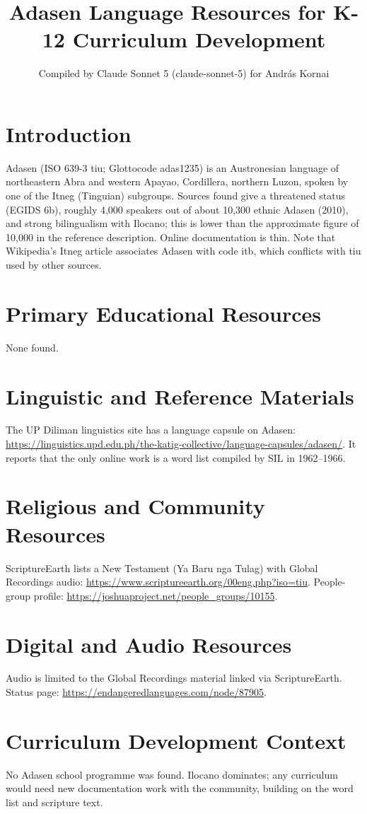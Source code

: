\documentclass[12pt]{article}
\title{Adasen Language Resources for K-12 Curriculum Development}
\author{Compiled by Claude Sonnet 5 (claude-sonnet-5) for Andr\'as Kornai}
\date{}
\begin{document}
\maketitle
\section{Introduction}
Adasen (ISO 639-3 tiu; Glottocode adas1235) is an Austronesian language of northeastern Abra and western Apayao, Cordillera, northern Luzon, spoken by one of the Itneg (Tinguian) subgroups. Sources found give a threatened status (EGIDS 6b), roughly 4,000 speakers out of about 10,300 ethnic Adasen (2010), and strong bilingualism with Ilocano; this is lower than the approximate figure of 10,000 in the reference description. Online documentation is thin. Note that Wikipedia's Itneg article associates Adasen with code itb, which conflicts with tiu used by other sources.
\section{Primary Educational Resources}
None found.
\section{Linguistic and Reference Materials}
The UP Diliman linguistics site has a language capsule on Adasen: \url{https://linguistics.upd.edu.ph/the-katig-collective/language-capsules/adasen/}. It reports that the only online work is a word list compiled by SIL in 1962--1966.
\section{Religious and Community Resources}
ScriptureEarth lists a New Testament (Ya Baru nga Tulag) with Global Recordings audio: \url{https://www.scriptureearth.org/00eng.php?iso=tiu}. People-group profile: \url{https://joshuaproject.net/people_groups/10155}.
\section{Digital and Audio Resources}
Audio is limited to the Global Recordings material linked via ScriptureEarth. Status page: \url{https://endangeredlanguages.com/node/87905}.
\section{Curriculum Development Context}
No Adasen school programme was found. Ilocano dominates; any curriculum would need new documentation work with the community, building on the word list and scripture text.
\end{document}
